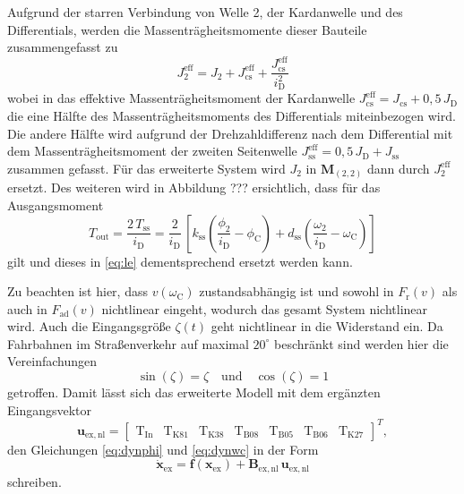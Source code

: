 Aufgrund der starren Verbindung von Welle 2, der Kardanwelle und des Differentials, werden die Massenträgheitsmomente dieser Bauteile zusammengefasst zu
\begin{equation}
J^\mathrm{eff}_2 = J_2 + J^\mathrm{eff}_\mathrm{cs} + \frac{J^\mathrm{eff}_\mathrm{cs}}{i_\mathrm{D}^2}
\end{equation}
wobei in das effektive Massenträgheitsmoment der Kardanwelle $J^\mathrm{eff}_\mathrm{cs} = J_\mathrm{cs} + 0,5\,J_\mathrm{D}$ die eine Hälfte des Massenträgheitsmoments des Differentials miteinbezogen wird. Die andere Hälfte wird aufgrund der Drehzahldifferenz nach dem Differential mit dem Massenträgheitsmoment der zweiten Seitenwelle $J^\mathrm{eff}_\mathrm{ss} =  0,5\,J_\mathrm{D} + J_\mathrm{ss}$ zusammen gefasst. Für das erweiterte System wird $J_2$ in $\pmb{M}_(2,2)$ dann durch $J^\mathrm{eff}_2$ ersetzt. Des weiteren wird in Abbildung ??? ersichtlich, dass für das Ausgangsmoment 
\begin{equation}
T_\mathrm{out} = \frac{2\,T_\mathrm{ss}}{i_\mathrm{D}} = \frac{2}{i_\mathrm{D}}\,\left[ k_\mathrm{ss}\left(\frac{\phi_2}{i_{\mathrm{D}}} - \phi_\mathrm{C}\right) + d_\mathrm{ss}\left(\frac{\omega_2}{i_{\mathrm{D}}} - \omega_\mathrm{C}\right)\right]
\end{equation}
gilt und dieses in \eqref{eq:le} dementsprechend ersetzt werden kann.

Zu beachten ist hier, dass $v(\omega_\mathrm{C})$ zustandsabhängig ist und sowohl in $F_\mathrm{r}(v)$ als auch in $F_\mathrm{ad}(v)$ nichtlinear eingeht, wodurch das gesamt System nichtlinear wird. Auch die Eingangsgröße $\zeta(t)$ geht nichtlinear in die Widerstand ein. Da Fahrbahnen im Straßenverkehr auf maximal $20^\circ$ beschränkt sind werden hier die Vereinfachungen
\begin{equation}
\sin(\zeta) = \zeta \quad \mathrm{und} \quad \cos(\zeta) = 1
\end{equation}  
getroffen. Damit lässt sich das erweiterte Modell mit dem ergänzten Eingangsvektor
\begin{equation}\label{eq:uex}
\pmb{u}_\mathrm{ex,nl} = \begin{bmatrix} \mathrm{T}_{\mathrm{In}} & \mathrm{T}_{\mathrm{K81}} & \mathrm{T}_{\mathrm{K38}} & \mathrm{T}_{\mathrm{B08}} & \mathrm{T}_{\mathrm{B05}} & \mathrm{T}_{\mathrm{B06}} & \mathrm{T}_{\mathrm{K27}}\end{bmatrix}^T,
\end{equation}
den Gleichungen \eqref{eq:dynphi} und \eqref{eq:dynwc} in der Form 
\begin{equation}
\dot{\pmb{x}}_\mathrm{ex} = \pmb{f}(\pmb{x}_\mathrm{ex}) + \pmb{B}_\mathrm{ex,nl}\,\pmb{u}_\mathrm{ex,nl}
\end{equation}
schreiben.

